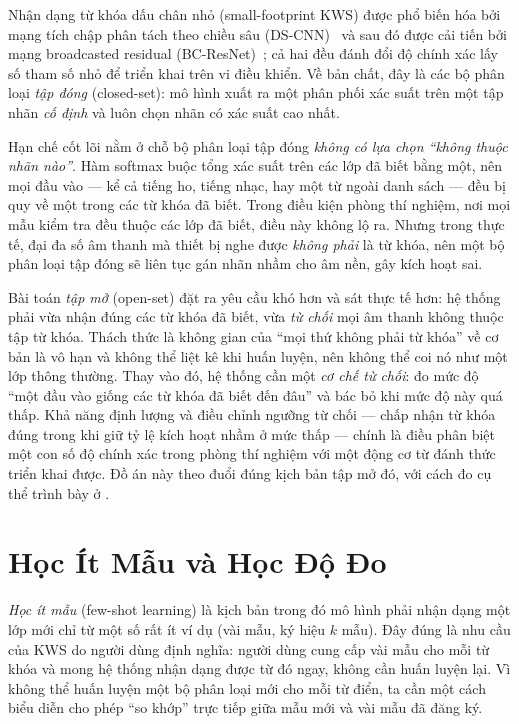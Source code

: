 \documentclass[12pt,a4paper]{report}
\begin{document}
Nhận dạng từ khóa dấu chân nhỏ (small-footprint KWS) được phổ biến hóa bởi mạng
tích chập phân tách theo chiều sâu (DS-CNN)~\cite{zhang2017hello} và sau đó được
cải tiến bởi mạng broadcasted residual (BC-ResNet)~\cite{kim2021bcresnet}; cả hai
đều đánh đổi độ chính xác lấy số tham số nhỏ để triển khai trên vi điều khiển. Về
bản chất, đây là các bộ phân loại \emph{tập đóng} (closed-set): mô hình xuất ra
một phân phối xác suất trên một tập nhãn \emph{cố định} và luôn chọn nhãn có xác
suất cao nhất.

Hạn chế cốt lõi nằm ở chỗ bộ phân loại tập đóng \emph{không có lựa chọn ``không
thuộc nhãn nào''}. Hàm softmax buộc tổng xác suất trên các lớp đã biết bằng một,
nên mọi đầu vào --- kể cả tiếng ho, tiếng nhạc, hay một từ ngoài danh sách --- đều
bị quy về một trong các từ khóa đã biết. Trong điều kiện phòng thí nghiệm, nơi mọi
mẫu kiểm tra đều thuộc các lớp đã biết, điều này không lộ ra. Nhưng trong thực tế,
đại đa số âm thanh mà thiết bị nghe được \emph{không phải} là từ khóa, nên một bộ
phân loại tập đóng sẽ liên tục gán nhãn nhầm cho âm nền, gây kích hoạt sai.

Bài toán \emph{tập mở} (open-set) đặt ra yêu cầu khó hơn và sát thực tế hơn: hệ
thống phải vừa nhận đúng các từ khóa đã biết, vừa \emph{từ chối} mọi âm thanh
không thuộc tập từ khóa. Thách thức là không gian của ``mọi thứ không phải từ
khóa'' về cơ bản là vô hạn và không thể liệt kê khi huấn luyện, nên không thể coi
nó như một lớp thông thường. Thay vào đó, hệ thống cần một \emph{cơ chế từ chối}:
đo mức độ ``một đầu vào giống các từ khóa đã biết đến đâu'' và bác bỏ khi mức độ
này quá thấp. Khả năng định lượng và điều chỉnh ngưỡng từ chối --- chấp nhận từ
khóa đúng trong khi giữ tỷ lệ kích hoạt nhầm ở mức thấp --- chính là điều phân
biệt một con số độ chính xác trong phòng thí nghiệm với một động cơ từ đánh thức
triển khai được. Đồ án này theo đuổi đúng kịch bản tập mở đó, với cách đo cụ thể
trình bày ở .

\section{Học Ít Mẫu và Học Độ Đo}\label{sec:fewshot-bg}

\emph{Học ít mẫu} (few-shot learning) là kịch bản trong đó mô hình phải nhận dạng
một lớp mới chỉ từ một số rất ít ví dụ (vài mẫu, ký hiệu $k$ mẫu). Đây đúng là nhu
cầu của KWS do người dùng định nghĩa: người dùng cung cấp vài mẫu cho mỗi từ khóa
và mong hệ thống nhận dạng được từ đó ngay, không cần huấn luyện lại. Vì không thể
huấn luyện một bộ phân loại mới cho mỗi từ điển, ta cần một cách biểu diễn cho phép
``so khớp'' trực tiếp giữa mẫu mới và vài mẫu đã đăng ký.
\end{document}
